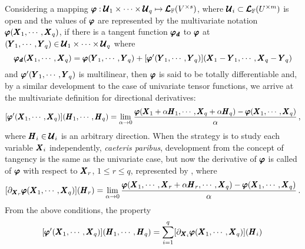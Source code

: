 Considering a mapping $\pmb{\varphi} : \pmb{\mathcal{U}}_1\times\cdots\times\pmb{\mathcal{U}}_q \mapsto \pmb{\mathcal{L}}_{\mathbb{F}}(V^{\times s})$, where $\pmb{\mathcal{U}}_i\subset\pmb{\mathcal{L}}_{\mathbb{F}}(U^{\times m})$ is open and the values of $\pmb{\varphi}$ are represented by the multivariate notation $\pmb{\varphi}(\pmb{X}_1,\cdots,\pmb{X}_q)$, if there is a tangent function $\pmb{\varphi_\mathit{d}}$ to $\pmb{\varphi}$ at $(\pmb{Y}_1,\cdots,\pmb{Y}_q)\in\pmb{\mathcal{U}}_1\times\cdots\times\pmb{\mathcal{U}}_q$ where
\begin{equation*}
\pmb{\varphi_\mathit{d}}(\pmb{X}_1,\cdots,\pmb{X}_q)=\pmb{\varphi}(\pmb{Y}_1,\cdots,\pmb{Y}_q)+[\pmb{\varphi}'(\pmb{Y}_1,\cdots,\pmb{Y}_q)](\pmb{X}_1-\pmb{Y}_1,\cdots,\pmb{X}_q-\pmb{Y}_q)
\end{equation*}
and $\pmb{\varphi}'(\pmb{Y}_1,\cdots,\pmb{Y}_q)$ is multilinear, then $\pmb{\varphi}$ is said to be totally differentiable and, by a similar development to the case of univariate tensor functions, we arrive at the multivariate definition for directional derivatives:
\begin{equation}\label{eq:totalDerivative}
[\pmb{\varphi}'(\pmb{X}_1,\cdots,\pmb{X}_q)](\pmb{H}_1,\cdots,\pmb{H}_q)=\lim_{\alpha\to 0} \dfrac{\pmb{\varphi}(\pmb{X}_1+\alpha\pmb{H}_1,\cdots,\pmb{X}_q+\alpha\pmb{H}_q)-\pmb{\varphi}(\pmb{X}_1,\cdots,\pmb{X}_q)}{\alpha}\,,
\end{equation}
where $\pmb{H}_i\in\pmb{\mathcal{U}}_i$ is an arbitrary direction. When the strategy is to study each variable $\pmb{X}_i$ independently, \emph{caeteris paribus}, development from the concept of tangency is the same as the univariate case, but now the derivative of $\pmb{\varphi}$  is called  of $\pmb{\varphi}$ with respect to $\pmb{X}_r$, $1\leqslant r\leqslant q$, represented by , where
\begin{equation}\label{eq:partialDerivative}
[\partial_{\pmb{X}_r}\pmb{\varphi}(\pmb{X}_1,\cdots,\pmb{X}_q)]{(\pmb{H}_r)}=\lim_{\alpha\to 0} \dfrac{\pmb{\varphi}(\pmb{X}_1,\cdots,\pmb{X}_r+\alpha\pmb{H}_r,\cdots,\pmb{X}_q)-\pmb{\varphi}(\pmb{X}_1,\cdots,\pmb{X}_q)}{\alpha}\,.
\end{equation}
From the above conditions, the property 
\begin{equation}
[\pmb{\varphi}'(\pmb{X}_1,\cdots,\pmb{X}_q)](\pmb{H}_1,\cdots,\pmb{H}_q)=\sum_{i=1}^{q}[\partial_{\pmb{X}_i}\pmb{\varphi}(\pmb{X}_1,\cdots,\pmb{X}_q)]{(\pmb{H}_i)}\,
\end{equation}
